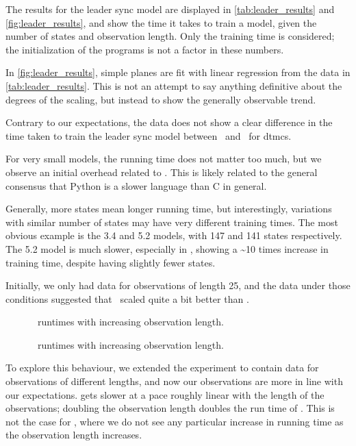 The results for the leader sync model are displayed in \autoref{tab:leader_results} and \autoref{fig:leader_results}, and show the time it takes to train a model, given the number of states and observation length.
Only the training time is considered; the initialization of the programs is not a factor in these numbers.

In \autoref{fig:leader_results}, simple planes are fit with linear regression from the data in \autoref{tab:leader_results}.
This is not an attempt to say anything definitive about the degrees of the scaling, but instead to show the generally observable trend.

Contrary to our expectations, the data does not show a clear difference in the time taken to train the leader sync model between \Jajapy\ and \Cupaal\ for \glspl{dtmc}.

For very small models, the running time does not matter too much, but we observe an initial overhead related to \Jajapy. This is likely related to the general consensus that Python is a slower language than C in general.

Generally, more states mean longer running time, but interestingly, variations with similar number of states may have very different training times.
The most obvious example is the 3.4 and 5.2 models, with 147 and 141 states respectively.
The 5.2 model is much slower, especially in \Cupaal, showing a \textasciitilde10 times increase in training time, despite having slightly fewer states.

Initially, we only had data for observations of length 25, and the data under those conditions suggested that \Jajapy\ scaled quite a bit better than \Cupaal.

\begin{figure}[htb!]
    
    \caption{\Cupaal\ runtimes with increasing observation length.}
    \label{fig:cupaal-length-to-runtime}
\end{figure}


\begin{figure}[htb!]
    
    \caption{\Jajapy\ runtimes with increasing observation length.}
    \label{fig:jajapy-length-to-runtime}
\end{figure}


To explore this behaviour, we extended the experiment to contain data for observations of different lengths, and now our observations are more in line with our expectations.
\Jajapy gets slower at a pace roughly linear with the length of the observations; doubling the observation length doubles the run time of \Jajapy.
This is not the case for \Cupaal, where we do not see any particular increase in running time as the observation length increases.

